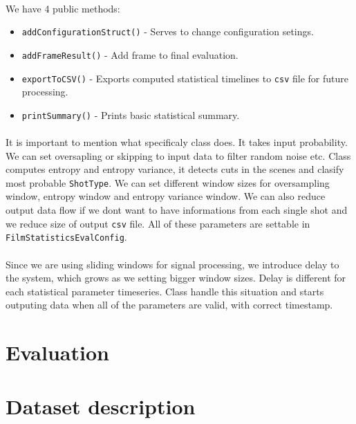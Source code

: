 \documentclass[english]{article}
\begin{document}
		\paragraph{}
			We have 4 public methods:
			\begin{itemize}
				\item \texttt{addConfigurationStruct()} - Serves to change configuration setings.
				\item \texttt{addFrameResult()} - Add frame to final evaluation.
				\item \texttt{exportToCSV()} - Exports computed statistical timelines to \texttt{csv} file for future processing.
				\item \texttt{printSummary()} - Prints basic statistical summary.
			\end{itemize}

		\paragraph{}
			It is important to mention what specificaly class does. It takes input probability. We can set oversapling or skipping to
			input data to filter random noise etc. Class computes entropy and entropy variance, it detects cuts in the scenes
			and clasify most probable \texttt{ShotType}. We can set different window sizes for oversampling window, entropy window and 
			entropy variance window. We can also reduce output data flow if we dont want to have informations from each single shot and we reduce size
			of output \texttt{csv} file. All of these parameters are settable in \texttt{FilmStatisticsEvalConfig}.
		\paragraph{}
			Since we are using sliding windows for signal processing, we introduce delay to the system, which grows as
			we setting bigger window sizes. Delay is different for each statistical parameter timeseries. Class handle this situation and starts
			outputing data when all of the parameters are valid, with correct timestamp.


\section{Evaluation}

\section{Dataset description}
\end{document}
